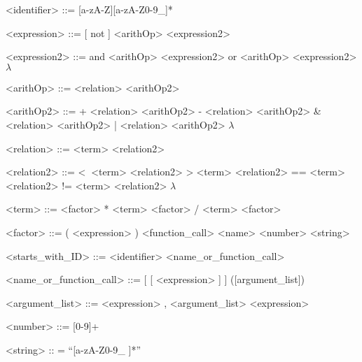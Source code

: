 \documentclass{article}
\newenvironment{grammar*}{\bfseries\begin{grammar}}{\end{grammar}\rmfamily}
\begin{document}
\begin{grammar*}
  <identifier> ::= [a-zA-Z][a-zA-Z0-9_]*


  <expression> ::= [ not ] <arithOp> <expression2>

  <expression2> ::=  and <arithOp> <expression2>
  \alt or <arithOp> <expression2>
  \alt $\lambda$

  <arithOp> ::= <relation> <arithOp2>

  <arithOp2> ::= + <relation> <arithOp2>
  \alt - <relation> <arithOp2>
  \alt \& <relation> <arithOp2>
  \alt | <relation> <arithOp2>
  \alt $\lambda$

  <relation> ::= <term> <relation2>
  
  <relation2> ::= \textless  $\;\;$<term> <relation2>
  \alt \textgreater $\;$<term> <relation2>
  \alt == <term> <relation2>
  \alt != <term> <relation2>
  \alt $\lambda$

  <term> ::= 
  <factor> * <term>
  \alt <factor> / <term>
  \alt <factor>

  <factor> ::=  
  ( <expression> )
  \alt  <function_call>
  \alt <name> 
  \alt <number> 
  \alt <string>

  <starts_with_ID> ::= <identifier> <name_or_function_call>
  
  <name_or_function_call> ::= [ [ <expression> ] ] \alt ([argument_list])

  <argument_list> ::=
  <expression> , <argument_list>
  \alt <expression>

  <number> ::= [0-9]+

  <string> :: = “[a-zA-Z0-9_ ]*”
\end{grammar*}

\end{document}
